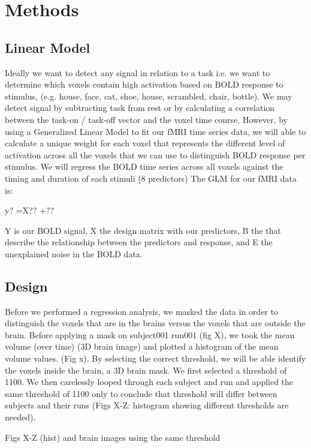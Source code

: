 \documentclass[11pt]{article}
\begin{document}
\section{Methods}

\subsection{Linear Model}
Ideally we want to detect any signal in relation to a task i.e. we want to determine which voxels contain high activation based on BOLD response to stimulus, (e.g. house, face, cat, shoe, house, scrambled, chair, bottle). We may detect signal by subtracting task from rest or by calculating a correlation between the task-on / task-off vector and the voxel time course. However, by using a Generalized Linear Model to fit our fMRI time series data, we will able to calculate a unique weight for each voxel that represents the different level of activation across all the voxels that we can use to distinguish BOLD response per stimulus.  We will regress the BOLD time series across all voxels against the timing and duration of each stimuli (8 predictors) The GLM for our fMRI data is:

y? =X?? +??

Y is our BOLD signal, X the design matrix with our predictors, B the that describe the relationship between the predictors and response, and E the unexplained noise in the BOLD data.

\subsection{Design}
Before we performed a regression analysis, we masked the data in order to distinguish the voxels that are in the brains versus the voxels that are outside the brain. Before applying a mask on subject001 run001 (fig X), we took the mean volume (over time) (3D brain image) and plotted a histogram of the mean volume values. (Fig x). By selecting the correct threshold, we will be able identify the voxels inside the brain, a 3D brain mask. We first selected a threshold of 1100. We then carelessly looped through each subject and run and applied the same threshold of 1100 only to conclude that threshold will differ between subjects and their runs (Figs X-Z: histogram showing different thresholds are needed). 

                                                  Figs X-Z (hist)
                                                   and brain images using the same threshold
\end{document}
